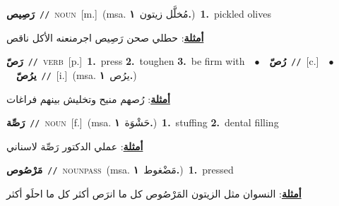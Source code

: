 \documentclass[10pt,a4paper,twoside]{article} %
\begin{document}
\begin{multicols}{2}
{\setlength\topsep{0pt}\textbf{\foreignlanguage{arabic}{رَصِيص}}\ {\color{gray}\texttt{//}\color{black}}\ \textsc{noun}\ [m.]\ \color{gray}(msa. \foreignlanguage{arabic}{مُخلَّل زيتون}~\foreignlanguage{arabic}{\textbf{١.}})\color{black}\ \textbf{1.}~pickled olives\  \begin{flushright}\color{gray}\foreignlanguage{arabic}{\textbf{\underline{\foreignlanguage{arabic}{أمثلة}}}: حطلي صحن رَصِيص اجرمنعنه الأكل ناقص}\end{flushright}\color{black}} \vspace{2mm}

{\setlength\topsep{0pt}\textbf{\foreignlanguage{arabic}{رَصّ}}\ {\color{gray}\texttt{//}\color{black}}\ \textsc{verb}\ [p.]\ \textbf{1.}~press  \textbf{2.}~toughen  \textbf{3.}~be firm with\ \ $\bullet$\ \ \setlength\topsep{0pt}\textbf{\foreignlanguage{arabic}{رُصّ}}\ {\color{gray}\texttt{//}\color{black}}\ [c.]\ \ $\bullet$\ \ \setlength\topsep{0pt}\textbf{\foreignlanguage{arabic}{يرُصّ}}\ {\color{gray}\texttt{//}\color{black}}\ [i.]\ \color{gray}(msa. \foreignlanguage{arabic}{يرُص}~\foreignlanguage{arabic}{\textbf{١.}})\color{black}\  \begin{flushright}\color{gray}\foreignlanguage{arabic}{\textbf{\underline{\foreignlanguage{arabic}{أمثلة}}}: رُصهم منيح وتخليش بينهم فراغات}\end{flushright}\color{black}} \vspace{2mm}

{\setlength\topsep{0pt}\textbf{\foreignlanguage{arabic}{رَصِّة}}\ {\color{gray}\texttt{//}\color{black}}\ \textsc{noun}\ [f.]\ \color{gray}(msa. \foreignlanguage{arabic}{حَشْوَة}~\foreignlanguage{arabic}{\textbf{١.}})\color{black}\ \textbf{1.}~stuffing  \textbf{2.}~dental filling\  \begin{flushright}\color{gray}\foreignlanguage{arabic}{\textbf{\underline{\foreignlanguage{arabic}{أمثلة}}}: عملي الدكتور رَصِّة لاسناني}\end{flushright}\color{black}} \vspace{2mm}

{\setlength\topsep{0pt}\textbf{\foreignlanguage{arabic}{مَرْصُوص}}\ {\color{gray}\texttt{//}\color{black}}\ \textsc{noun\textunderscore pass}\ \color{gray}(msa. \foreignlanguage{arabic}{مَضْغوط}~\foreignlanguage{arabic}{\textbf{١.}})\color{black}\ \textbf{1.}~pressed\  \begin{flushright}\color{gray}\foreignlanguage{arabic}{\textbf{\underline{\foreignlanguage{arabic}{أمثلة}}}: النسوان مثل الزيتون المَرْصُوص كل ما انرَص أكثر كل ما احلَو أكثر}\end{flushright}\color{black}} \vspace{2mm}


\end{multicols}
\end{document}

